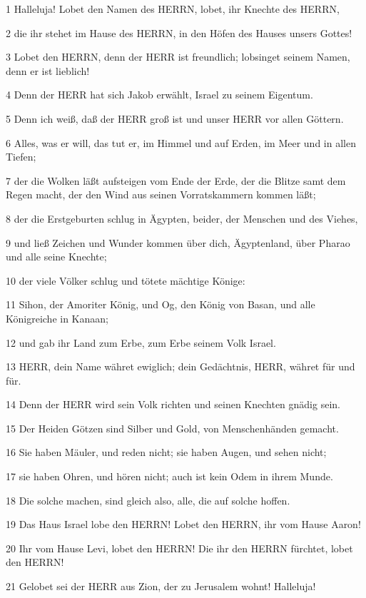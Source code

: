 \par 1 Halleluja! Lobet den Namen des HERRN, lobet, ihr Knechte des HERRN,
\par 2 die ihr stehet im Hause des HERRN, in den Höfen des Hauses unsers Gottes!
\par 3 Lobet den HERRN, denn der HERR ist freundlich; lobsinget seinem Namen, denn er ist lieblich!
\par 4 Denn der HERR hat sich Jakob erwählt, Israel zu seinem Eigentum.
\par 5 Denn ich weiß, daß der HERR groß ist und unser HERR vor allen Göttern.
\par 6 Alles, was er will, das tut er, im Himmel und auf Erden, im Meer und in allen Tiefen;
\par 7 der die Wolken läßt aufsteigen vom Ende der Erde, der die Blitze samt dem Regen macht, der den Wind aus seinen Vorratskammern kommen läßt;
\par 8 der die Erstgeburten schlug in Ägypten, beider, der Menschen und des Viehes,
\par 9 und ließ Zeichen und Wunder kommen über dich, Ägyptenland, über Pharao und alle seine Knechte;
\par 10 der viele Völker schlug und tötete mächtige Könige:
\par 11 Sihon, der Amoriter König, und Og, den König von Basan, und alle Königreiche in Kanaan;
\par 12 und gab ihr Land zum Erbe, zum Erbe seinem Volk Israel.
\par 13 HERR, dein Name währet ewiglich; dein Gedächtnis, HERR, währet für und für.
\par 14 Denn der HERR wird sein Volk richten und seinen Knechten gnädig sein.
\par 15 Der Heiden Götzen sind Silber und Gold, von Menschenhänden gemacht.
\par 16 Sie haben Mäuler, und reden nicht; sie haben Augen, und sehen nicht;
\par 17 sie haben Ohren, und hören nicht; auch ist kein Odem in ihrem Munde.
\par 18 Die solche machen, sind gleich also, alle, die auf solche hoffen.
\par 19 Das Haus Israel lobe den HERRN! Lobet den HERRN, ihr vom Hause Aaron!
\par 20 Ihr vom Hause Levi, lobet den HERRN! Die ihr den HERRN fürchtet, lobet den HERRN!
\par 21 Gelobet sei der HERR aus Zion, der zu Jerusalem wohnt! Halleluja!

